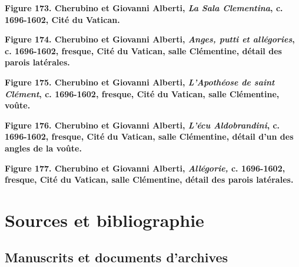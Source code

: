 \documentclass[12pt,twoside,openany]{book}
\begin{document}
\begin{center}
\par\small \textbf{Figure 173. Cherubino et Giovanni Alberti, \textit{La Sala Clementina}, c. 1696-1602, Cité du Vatican.}
\end{center}

\begin{center}
\par\small \textbf{Figure 174. Cherubino et Giovanni Alberti, \textit{Anges, putti et allégories}, c. 1696-1602, fresque, Cité du Vatican, salle Clémentine, détail des parois latérales.}
\end{center}

\begin{center}
\par\small \textbf{Figure 175. Cherubino et Giovanni Alberti, \textit{L’Apothéose de saint Clément}, c. 1696-1602, fresque, Cité du Vatican, salle Clémentine, voûte.}
\end{center}

\begin{center}
\par\small \textbf{Figure 176. Cherubino et Giovanni Alberti, \textit{L’écu Aldobrandini}, c. 1696-1602, fresque, Cité du Vatican, salle Clémentine, détail d’un des angles de la voûte.}
\end{center}

\begin{center}
\par\small \textbf{Figure 177. Cherubino et Giovanni Alberti, \textit{Allégorie, }c. 1696-1602, fresque, Cité du Vatican, salle Clémentine, détail des parois latérales.}
\end{center}

\chapter*{Sources et bibliographie}

\section{Manuscrits et documents d’archives}
\end{document}

